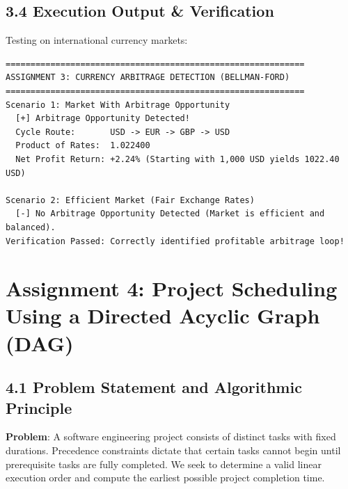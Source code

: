 \documentclass[12pt]{article}
\begin{document}
\subsection*{3.4 Execution Output \& Verification}
Testing on international currency markets:
\begin{lstlisting}
============================================================
ASSIGNMENT 3: CURRENCY ARBITRAGE DETECTION (BELLMAN-FORD)
============================================================
Scenario 1: Market With Arbitrage Opportunity
  [+] Arbitrage Opportunity Detected!
  Cycle Route:       USD -> EUR -> GBP -> USD
  Product of Rates:  1.022400
  Net Profit Return: +2.24% (Starting with 1,000 USD yields 1022.40 USD)

Scenario 2: Efficient Market (Fair Exchange Rates)
  [-] No Arbitrage Opportunity Detected (Market is efficient and balanced).
Verification Passed: Correctly identified profitable arbitrage loop!
\end{lstlisting}

\newpage

\section*{Assignment 4: Project Scheduling Using a Directed Acyclic Graph (DAG)}

\subsection*{4.1 Problem Statement and Algorithmic Principle}
\textbf{Problem}: A software engineering project consists of distinct tasks with fixed durations. Precedence constraints dictate that certain tasks cannot begin until prerequisite tasks are fully completed. We seek to determine a valid linear execution order and compute the earliest possible project completion time.
\end{document}

